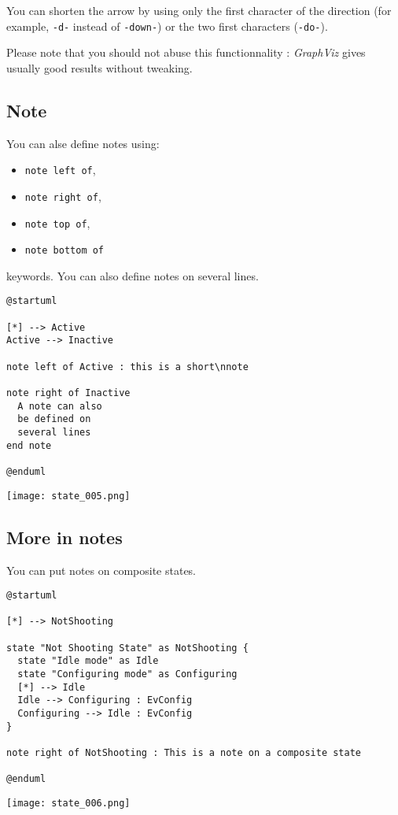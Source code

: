 You can shorten the arrow by using only the first character of the direction
(for example, \texttt{-d-} instead of \texttt{-down-}) or the two first
characters (\texttt{-do-}).

Please note that you should not abuse this functionnality : \textit{GraphViz}
gives usually good results without tweaking.

\newpage \subsection{Note}

You can alse define notes using:
\begin{itemize}
  \item \texttt{note left of},
  \item \texttt{note right of},
  \item \texttt{note top of},
  \item \texttt{note bottom of}  
\end{itemize}
keywords. You can also define notes on several lines.

\begin{lstlisting}
@startuml

[*] --> Active
Active --> Inactive

note left of Active : this is a short\nnote

note right of Inactive
  A note can also
  be defined on
  several lines
end note

@enduml
\end{lstlisting}
\begin{center}
\texttt{[image: state\_005.png]}
\end{center}


\newpage \subsection{More in notes}

You can put notes on composite states.

\begin{lstlisting}
@startuml

[*] --> NotShooting

state "Not Shooting State" as NotShooting {
  state "Idle mode" as Idle
  state "Configuring mode" as Configuring
  [*] --> Idle
  Idle --> Configuring : EvConfig
  Configuring --> Idle : EvConfig
}

note right of NotShooting : This is a note on a composite state

@enduml
\end{lstlisting}
\begin{center}
\texttt{[image: state\_006.png]}
\end{center}
        

        

        
